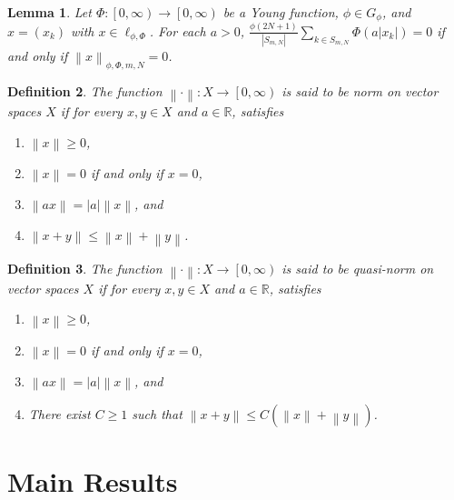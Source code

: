 \documentclass[12pt,a4paper]{article}
\newtheorem{definition}{Definition}[section]
\newtheorem{lemma}[definition]{Lemma}
\theoremstyle{remark}
\begin{document}
\begin{lemma}
    \cite{ref7} Let $\Phi : \left[0, \infty\right) \rightarrow \left[0, \infty\right)$ be a Young function, $\phi\in G_\phi$, and $x=\left(x_k\right)$ with $x\in\ell_{\phi,\Phi}$. For each $a>0$, $\frac{\phi\left(2N+1\right)}{\left|S_{m,N}\right|}\sum_{k\in S_{m,N}}\Phi\left(a\left|x_k\right|\right)=0$ if and only if $\left\lVert x\right\rVert _{\phi,\Phi,m,N}=0$.
\end{lemma}

\begin{definition}
    \cite{ref11} The function $\left\lVert \cdot\right\rVert : X \rightarrow \left[0, \infty\right)$ is said to be norm on vector spaces $X$ if for every $x,y\in X$ and $a\in\mathbb{R}$, satisfies
    \begin{enumerate}
        \item[a)] $\left\lVert x\right\rVert\geq 0$,
        \item[b)] $\left\lVert x\right\rVert = 0$ if and only if $x=0$,
        \item[c)] $\left\lVert ax\right\rVert = \left|a\right|\left\lVert x\right\rVert$, and
        \item[d)] $\left\lVert x+y\right\rVert \leq \left\lVert x\right\rVert +\left\lVert y\right\rVert$.
    \end{enumerate}
\end{definition}

\begin{definition}
    \cite{ref12} The function $\left\lVert \cdot\right\rVert : X \rightarrow \left[0, \infty\right)$ is said to be quasi-norm on vector spaces $X$ if for every $x,y\in X$ and $a\in\mathbb{R}$, satisfies
    \begin{enumerate}
        \item[a)] $\left\lVert x\right\rVert\geq 0$,
        \item[b)] $\left\lVert x\right\rVert = 0$ if and only if $x=0$,
        \item[c)] $\left\lVert ax\right\rVert = \left|a\right|\left\lVert x\right\rVert$, and
        \item[d)] There exist $C\geq 1$ such that $\left\lVert x+y\right\rVert \leq C\left(\left\lVert x\right\rVert +\left\lVert y\right\rVert\right)$.
    \end{enumerate}
\end{definition}

\section{Main Results}
\end{document}

